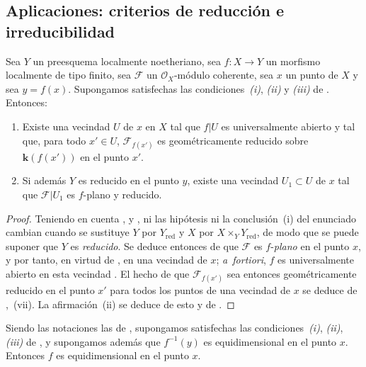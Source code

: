 \subsection{Aplicaciones: criterios de reducción e irreducibilidad}
\label{subsection:IV.15.3}

\begin{proposition}[15.3.1]
\label{IV.15.3.1}
Sea $Y$ un preesquema localmente noetheriano, sea $f:X\to Y$ un morfismo localmente de tipo finito, sea $\mathcal F$ un $\mathcal O_X$-módulo coherente, sea $x$ un punto de $X$ y sea $y=f(x)$.
Supongamos satisfechas las condiciones~\emph{(i)}, \emph{(ii)} y \emph{(iii)} de .
Entonces:
\begin{enumerate}[label=\textup{(\roman*)}]
  \item Existe una vecindad $U$ de $x$ en $X$ tal que $f|U$ es universalmente abierto y tal que, para todo $x'\in U$, $\mathcal F_{f(x')}$ es geométricamente reducido sobre $\boldsymbol{k}(f(x'))$ en el punto $x'$.
  \item Si además $Y$ es reducido en el punto $y$, existe una vecindad $U_1\subset U$ de $x$ tal que $\mathcal F|U_1$ es $f$-plano y reducido.
\end{enumerate}
\end{proposition}

\begin{proof}
\label{IV.15.3.1-proof}
Teniendo en cuenta ,  y , ni las hipótesis ni la conclusión~(i) del enunciado cambian cuando se sustituye $Y$ por $Y_{\mathrm{red}}$ y $X$ por $X\times_Y Y_{\mathrm{red}}$, de modo que se puede suponer que $Y$ es \emph{reducido}.
Se deduce entonces de  que $\mathcal F$ es $f$-\emph{plano} en el punto $x$, y por tanto, en virtud de , en una vecindad de $x$; \emph{a~fortiori}, $f$ es universalmente abierto en esta vecindad .
El hecho de que $\mathcal F_{f(x')}$ sea entonces geométricamente reducido en el punto $x'$
para todos los puntos de una vecindad de $x$ se deduce de ,~(vii).
La afirmación~(ii) se deduce de esto y de .
\end{proof}

\begin{proposition}[15.3.2]
\label{IV.15.3.2}
Siendo las notaciones las de , supongamos satisfechas las condiciones~\emph{(i)}, \emph{(ii)}, \emph{(iii)} de , y supongamos además que $f^{-1}(y)$ es equidimensional en el punto $x$.
Entonces $f$ es equidimensional en el punto $x$.
\end{proposition}

